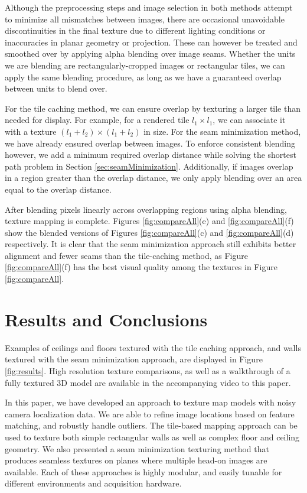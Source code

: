 \documentclass[10pt,twocolumn,letterpaper]{article}
\begin{document}
Although the preprocessing steps and image selection in both methods
attempt to minimize all mismatches between images, there are
occasional unavoidable discontinuities in the final texture due to
different lighting conditions or inaccuracies in planar geometry or
projection. These can however be treated and smoothed over by applying
alpha blending over image seams.  Whether the units we are blending
are rectangularly-cropped images or rectangular tiles, we can apply
the same blending procedure, as long as we have a guaranteed overlap
between units to blend over.

For the tile caching method, we can ensure overlap by texturing a
larger tile than needed for display. For example, for a rendered tile
$l_1 \times l_1$, we can associate it with a texture $(l_1 + l_2)
\times (l_1 + l_2)$ in size. For the seam minimization method, we have
already ensured overlap between images. To enforce consistent blending
however, we add a minimum required overlap distance while solving the
shortest path problem in Section
\ref{sec:seamMinimization}. Additionally, if images overlap in a
region greater than the overlap distance, we only apply blending over
an area equal to the overlap distance.

After blending pixels linearly across overlapping regions using alpha
blending, texture mapping is complete. Figures \ref{fig:compareAll}(e)
and \ref{fig:compareAll}(f) show the blended versions of Figures
\ref{fig:compareAll}(c) and \ref{fig:compareAll}(d) respectively. It
is clear that the seam minimization approach still exhibits better
alignment and fewer seams than the tile-caching method, as Figure
\ref{fig:compareAll}(f) has the best visual quality among the textures
in Figure \ref{fig:compareAll}.



\section{Results and Conclusions}
\label{sec:resultsAndConclusions}
Examples of ceilings and floors textured with the tile caching
approach, and walls textured with the seam minimization approach, are
displayed in Figure \ref{fig:results}. High resolution texture
comparisons, as well as a walkthrough of a fully textured 3D model are
available in the accompanying video to this paper.

In this paper, we have developed an approach to texture map models
with noisy camera localization data. We are able to refine image
locations based on feature matching, and robustly handle outliers. The
tile-based mapping approach can be used to texture both simple
rectangular walls as well as complex floor and ceiling geometry. We
also presented a seam minimization texturing method that produces
seamless textures on planes where multiple head-on images are
available. Each of these approaches is highly modular, and easily
tunable for different environments and acquisition hardware.
\end{document}
